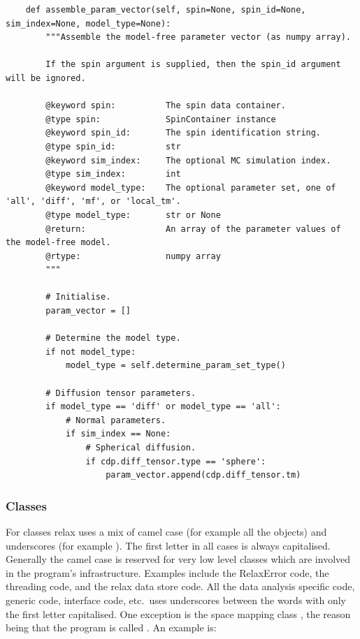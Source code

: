 \begin{lstlisting}
    def assemble_param_vector(self, spin=None, spin_id=None, sim_index=None, model_type=None):
        """Assemble the model-free parameter vector (as numpy array).

        If the spin argument is supplied, then the spin_id argument will be ignored.

        @keyword spin:          The spin data container.
        @type spin:             SpinContainer instance
        @keyword spin_id:       The spin identification string.
        @type spin_id:          str
        @keyword sim_index:     The optional MC simulation index.
        @type sim_index:        int
        @keyword model_type:    The optional parameter set, one of 'all', 'diff', 'mf', or 'local_tm'. 
        @type model_type:       str or None
        @return:                An array of the parameter values of the model-free model.
        @rtype:                 numpy array
        """

        # Initialise.
        param_vector = []

        # Determine the model type.
        if not model_type:
            model_type = self.determine_param_set_type()

        # Diffusion tensor parameters.
        if model_type == 'diff' or model_type == 'all':
            # Normal parameters.
            if sim_index == None:
                # Spherical diffusion.
                if cdp.diff_tensor.type == 'sphere':
                    param_vector.append(cdp.diff_tensor.tm)
\end{lstlisting}



\subsubsection{Classes}

For classes relax uses a mix of camel case (for example all the  objects) and underscores (for example ).  The first letter in all cases is always capitalised.  Generally the camel case is reserved for very low level classes which are involved in the program's infrastructure.  Examples include the RelaxError code, the threading code, and the relax data store code.  All the data analysis specific code, generic code, interface code, etc.\ uses underscores between the words with only the first letter capitalised.  One exception is the space mapping class , the reason being that the program is called .  An example is:

